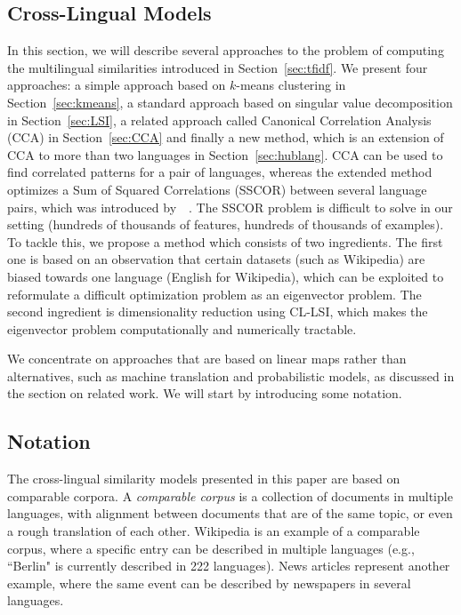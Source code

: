 \documentclass[twoside,11pt]{article}
\begin{document}
\subsection{Cross-Lingual Models}\label{sec:models}
In this section, we will describe several approaches to the problem of computing the multilingual similarities introduced in Section~\ref{sec:tfidf}. We present four approaches:
a simple approach based on $k$-means clustering in Section~\ref{sec:kmeans}, a standard approach based on singular value decomposition in Section~\ref{sec:LSI}, a related
approach called Canonical Correlation Analysis (CCA) in Section~\ref{sec:CCA} and finally a new method, which is an extension of CCA to more than two languages in Section~\ref{sec:hublang}.
%
CCA can be used to find correlated patterns for a pair of languages, whereas the extended method optimizes a
Sum of Squared Correlations (SSCOR) between several language pairs, which was introduced by~\citeauthor{Kettenring}~\citeyear{Kettenring}. The SSCOR problem is difficult to solve in our setting (hundreds of thousands of features, hundreds of thousands of examples). To tackle this, we propose a method which consists of two ingredients.
 The first one is based on an observation that certain datasets (such as Wikipedia) are biased towards one language (English for Wikipedia), which can be exploited
 to reformulate a difficult optimization problem as an eigenvector problem. The second ingredient is dimensionality reduction using CL-LSI, which
 makes the eigenvector problem computationally and numerically tractable.

We concentrate on approaches that are based on linear maps rather than alternatives, such as machine translation and probabilistic models, as discussed in the section on related work.
We will start by introducing some notation.

\subsection{Notation}\label{sec:notation}

The cross-lingual similarity models presented in this paper are based on comparable corpora. A \emph{comparable corpus} is a collection of documents in multiple languages, with alignment between documents that are of the same topic, or even a rough translation of each other. Wikipedia is an example of a comparable corpus, where a specific entry can be described in multiple languages (e.g., ``Berlin" is currently described in 222 languages). News articles represent another example, where the same event can be described by newspapers in several languages.
\end{document}
